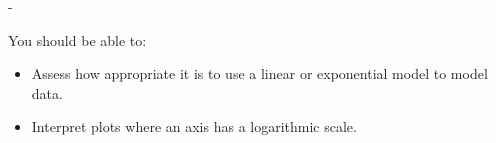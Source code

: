 \documentclass{article}
\makeatletter
\newlength{\tipmargin}
\renewenvironment{framed}{
  \setlength{\tipmargin}{\textwidth-\linewidth}
  \advance\@totalleftmargin-\tipmargin
  \def\FrameCommand{\hspace{\tipmargin}\fbox}%
  \advance\linewidth\tipmargin
  \MakeFramed {\advance\hsize-\width \FrameRestore}%
}
{\endMakeFramed}
\makeatother
\begin{document}

\begin{problemonly}
  \begin{framed}

You should be able to:
    \begin{itemize}[topsep=0pt,partopsep=0pt,parsep=8pt,itemsep=0pt]
    \item Assess how appropriate it is to use a linear or exponential model to model data.

    \item Interpret plots where an axis has a logarithmic scale. 

    \end{itemize}
  \end{framed}
\end{problemonly}
\end{document}
